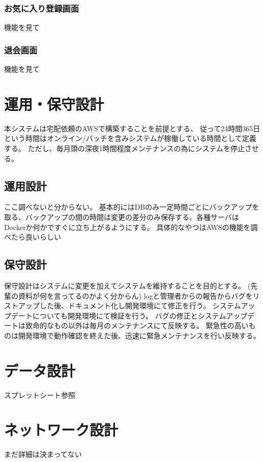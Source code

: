 \documentclass[a4paper, titlepage]{jsarticle}
\begin{document}
\subsubsection{お気に入り登録画面}
機能を見て
\subsubsection{退会画面}
機能を見て

\section{運用・保守設計}
本システムは宅配依頼のAWSで構築することを前提とする、
従って24時間365日という時間はオンライン/バッチを含みシステムが稼働している時間として定義する。
ただし、毎月頭の深夜1時間程度メンテナンスの為にシステムを停止させる。
\subsection{運用設計}
ここ調べないと分からない。
基本的にはDBのみ一定時間ごとにバックアップを取る、バックアップの間の時間は変更の差分のみ保存する、各種サーバはDockerか何かですぐに立ち上がるようにする。
具体的なやつはAWSの機能を調べたら良いらしい

\subsection{保守設計}
保守設計はシステムに変更を加えてシステムを維持することを目的とする。
(先輩の資料が何を言ってるのかよく分からん)
logと管理者からの報告からバグをリストアップした後、ドキュメント化し開発環境にて修正を行う。
システムアップデートについても開発環境にて検証を行う。
バグの修正とシステムアップデートは致命的なもの以外は毎月のメンテナンスにて反映する。
緊急性の高いものは開発環境で動作確認を終えた後、迅速に緊急メンテナンスを行い反映する。
\section{データ設計}
スプレットシート参照
\section{ネットワーク設計}
まだ詳細は決まってない



\end{document}
